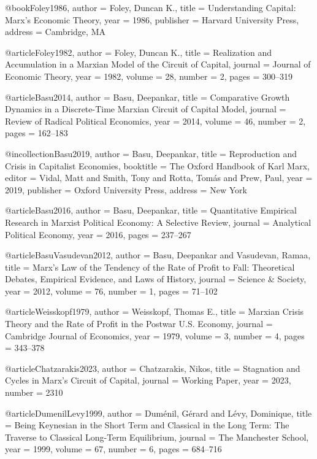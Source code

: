 @book{Foley1986,
	author    = {Foley, Duncan K.},
	title     = {Understanding Capital: Marx's Economic Theory},
	year      = {1986},
	publisher = {Harvard University Press},
	address   = {Cambridge, MA}
}

@article{Foley1982,
	author  = {Foley, Duncan K.},
	title   = {Realization and Accumulation in a {Marxian} Model of the Circuit of Capital},
	journal = {Journal of Economic Theory},
	year    = {1982},
	volume  = {28},
	number  = {2},
	pages   = {300--319}
}

@article{Basu2014,
	author  = {Basu, Deepankar},
	title   = {Comparative Growth Dynamics in a Discrete-Time {Marxian} Circuit of Capital Model},
	journal = {Review of Radical Political Economics},
	year    = {2014},
	volume  = {46},
	number  = {2},
	pages   = {162--183}
}

@incollection{Basu2019,
	author    = {Basu, Deepankar},
	title     = {Reproduction and Crisis in Capitalist Economies},
	booktitle = {The Oxford Handbook of Karl Marx},
	editor    = {Vidal, Matt and Smith, Tony and Rotta, Tom{\'a}s and Prew, Paul},
	year      = {2019},
	publisher = {Oxford University Press},
	address   = {New York}
}

@article{Basu2016,
	author  = {Basu, Deepankar},
	title   = {Quantitative Empirical Research in {Marxist} Political Economy: A Selective Review},
	journal = {Analytical Political Economy},
	year    = {2016},
	pages   = {237--267}
}

@article{BasuVasudevan2012,
	author  = {Basu, Deepankar and Vasudevan, Ramaa},
	title   = {Marx's Law of the Tendency of the Rate of Profit to Fall: Theoretical Debates, Empirical Evidence, and Laws of History},
	journal = {Science \& Society},
	year    = {2012},
	volume  = {76},
	number  = {1},
	pages   = {71--102}
}

@article{Weisskopf1979,
	author  = {Weisskopf, Thomas E.},
	title   = {Marxian Crisis Theory and the Rate of Profit in the Postwar {U.S.} Economy},
	journal = {Cambridge Journal of Economics},
	year    = {1979},
	volume  = {3},
	number  = {4},
	pages   = {343--378}
}

@article{Chatzarakis2023,
	author  = {Chatzarakis, Nikos},
	title   = {Stagnation and Cycles in {Marx}'s Circuit of Capital},
	journal = {Working Paper},
	year    = {2023},
	number  = {2310}
}

@article{DumenilLevy1999,
	author  = {Dum{\'e}nil, G{\'e}rard and L{\'e}vy, Dominique},
	title   = {Being {Keynesian} in the Short Term and Classical in the Long Term: The Traverse to Classical Long-Term Equilibrium},
	journal = {The Manchester School},
	year    = {1999},
	volume  = {67},
	number  = {6},
	pages   = {684--716}
}


